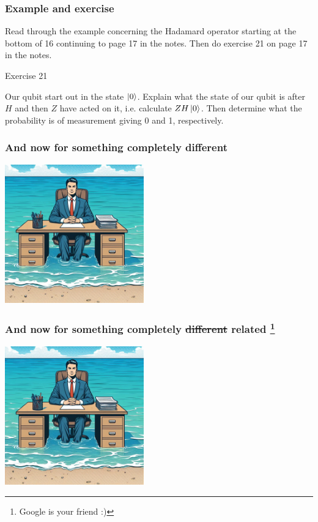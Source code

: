 \documentclass[10pt]{beamer}
\begin{document}
\begin{frame}
  \frametitle{Example and exercise}
  Read through the example concerning the Hadamard operator starting at the bottom of 16 continuing to page 17 in the notes.
  Then do exercise 21 on page 17 in the notes.

  \begin{block}{Exercise 21}
   \centerline{
} 

Our qubit start out in the state $\ket{0}$. Explain what the state of our qubit is after $H$ and then $Z$ have acted on it, i.e. calculate $ZH\ket{0}$. Then determine what the probability is of measurement giving 0 and 1, respectively.
  \end{block}
\end{frame}
\begin{frame}
  \frametitle{And now for something completely different}
  \centering
  \includegraphics[width=6cm]{img/completely_different.jpeg}
\end{frame}
\begin{frame}
  \frametitle{And now for something completely \sout{different} related \footnote{Google is your friend :)}}
  \centering
  \includegraphics[width=6cm]{img/completely_different.jpeg}
\end{frame}
\end{document}
